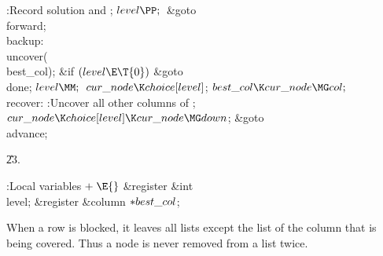 :Record solution and \X;\2\6
${}\\{level}\PP;{}$\6
\&{goto} \\{forward};\6
\4\\{backup}:\5
\\{uncover}(\\{best\_col});\6
\&{if} ${}(\\{level}\E\T{0}){}$\1\5
\&{goto} \\{done};\2\6
${}\\{level}\MM;{}$\6
${}\\{cur\_node}\K\\{choice}[\\{level}]{}$;\5
${}\\{best\_col}\K\\{cur\_node}\MG\\{col};{}$\6
\4\\{recover}:\5
:Uncover all other columns of \X;\6
${}\\{cur\_node}\K\\{choice}[\\{level}]\K\\{cur\_node}\MG\\{down}{}$;\5
\&{goto} \\{advance};\par
\U23.\fi

\B{}:Local variables\X${}\mathrel+\E{}$\6
\&{register} \&{int} \\{level};\6
\&{register} \&{column} ${}{*}\\{best\_col}{}$;\par
\fi

When a row is blocked, it leaves all lists except the
list of the
column that is being covered. Thus a node is never removed from a list
twice.

